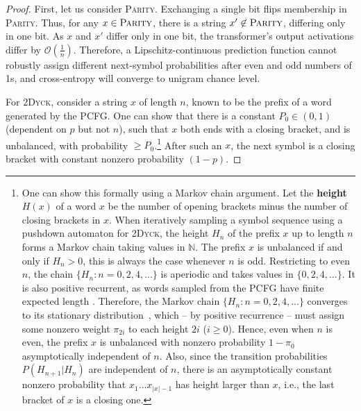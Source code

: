 \documentclass[11pt,a4paper]{article}
\newcommand{\key}[1]{\textbf{#1}}
\begin{document}
\begin{proof}
First, let us consider \textsc{Parity}.
Exchanging a single bit flips membership in \textsc{Parity}.
Thus, for any $x \in \textsc{Parity}$, there is a string $x' \not\in \textsc{Parity}$, differing only in one bit.
As $x$ and $x'$ differ only in one bit, the transformer's output activations differ by $\mathcal{O}(\frac{1}{n})$.
Therefore, a Lipschitz-continuous prediction function cannot robustly assign different next-symbol probabilities after even and odd numbers of 1s, and cross-entropy will converge to unigram chance level.

For \textsc{2Dyck}, consider a string $x$ of length $n$, known to be the prefix of a word generated by the PCFG.
One can show that there is a constant $P_0 \in (0,1)$ (dependent on $p$ but not $n$), such that $x$ both ends with a closing bracket, and is unbalanced, with probability $\geq P_0$.\footnote{One can show this formally using a Markov chain argument.
Let the \key{height} $H(x)$ of a word $x$ be the number of opening brackets minus the number of closing brackets in $x$.
When iteratively sampling a symbol sequence using a pushdown automaton for \textsc{2Dyck}, the height $H_{n}$ of the prefix $x$ up to length $n$ forms a Markov chain taking values in $\mathbb{N}$. %
The prefix $x$ is unbalanced if and only if $H_n>0$, this is always the case whenever $n$ is odd.
Restricting to even $n$, the chain $\{H_{n} : n = 0, 2, 4, ...\}$ is aperiodic and takes values in $\{0, 2, 4, \dots\}$.
It is also positive recurrent, as words sampled from the PCFG have finite expected length \citep[2.2.1]{skachkova2018closing}.
Therefore, the Markov chain $\{H_{n} : n = 0, 2, 4, ...\}$ converges to its stationary distribution~\cite{mitzenmacherprobability}, which -- by positive recurrence -- must assign some nonzero weight $\pi_{2i}$ to each height  $2i$ ($i \geq 0$).
Hence, even when $n$ is even, the prefix $x$ is unbalanced with nonzero probability $1-\pi_0$ asymptotically independent of $n$.
Also, since the transition probabilities $P(H_{n+1}|H_n)$ are independent of $n$, there is an asymptotically constant nonzero probability that $x_1\dots x_{|x|-1}$ has height larger than $x$, i.e., the last bracket of $x$ is a closing one.}
After such an $x$, the next symbol is a closing bracket with constant nonzero probability $(1-p)$.

\end{proof}
\end{document}
